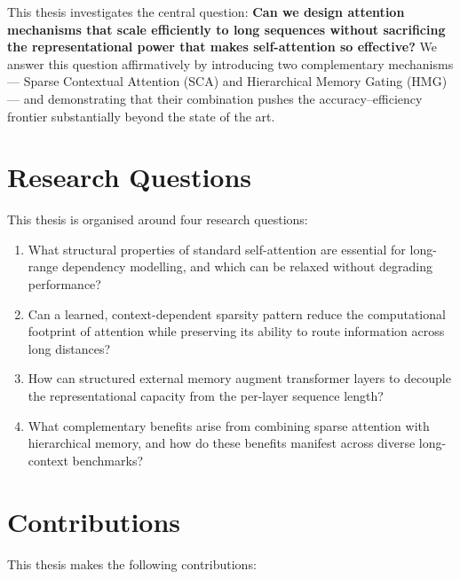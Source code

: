 \documentclass[12pt,a4paper,oneside]{book}
\begin{document}
This thesis investigates the central question: \textbf{Can we design attention mechanisms that
scale efficiently to long sequences without sacrificing the representational power that makes
self-attention so effective?} We answer this question affirmatively by introducing two
complementary mechanisms — Sparse Contextual Attention (SCA) and Hierarchical Memory Gating
(HMG) — and demonstrating that their combination pushes the accuracy--efficiency frontier
substantially beyond the state of the art.

\section{Research Questions}

This thesis is organised around four research questions:

\begin{enumerate}[label=\textbf{RQ\arabic*}, leftmargin=3em]
  \item What structural properties of standard self-attention are essential for long-range
    dependency modelling, and which can be relaxed without degrading performance?
  \item Can a learned, context-dependent sparsity pattern reduce the computational footprint
    of attention while preserving its ability to route information across long distances?
  \item How can structured external memory augment transformer layers to decouple the
    representational capacity from the per-layer sequence length?
  \item What complementary benefits arise from combining sparse attention with hierarchical
    memory, and how do these benefits manifest across diverse long-context benchmarks?
\end{enumerate}

\section{Contributions}

This thesis makes the following contributions:
\end{document}

